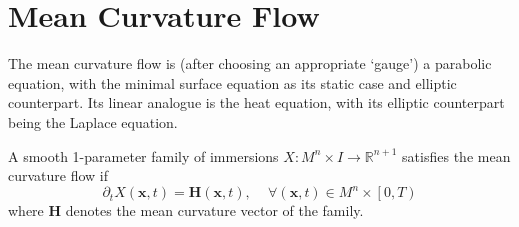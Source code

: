 \section{Mean Curvature Flow}

The mean curvature flow is (after choosing an appropriate `gauge') a parabolic equation, with the minimal surface equation as its static case and elliptic counterpart. Its linear analogue is the heat equation, with its elliptic counterpart being the Laplace equation.

\begin{definition}\label{def:Mean Curvature Flow}
    A smooth 1-parameter family of immersions $X:M^n\times I\to\mathbb{R}^{n+1}$ satisfies the mean curvature flow if
    \begin{equation}\label{eq:M-0-1}
        \partial_t X(\boldsymbol{x},t)=\boldsymbol{H}(\boldsymbol{x},t),\,\,\,\,\,\,\,\forall (\boldsymbol{x},t)\in M^n\times\left[0,T\right)
    \end{equation}
    where $\boldsymbol{H}$ denotes the mean curvature vector of the family.
\end{definition}

